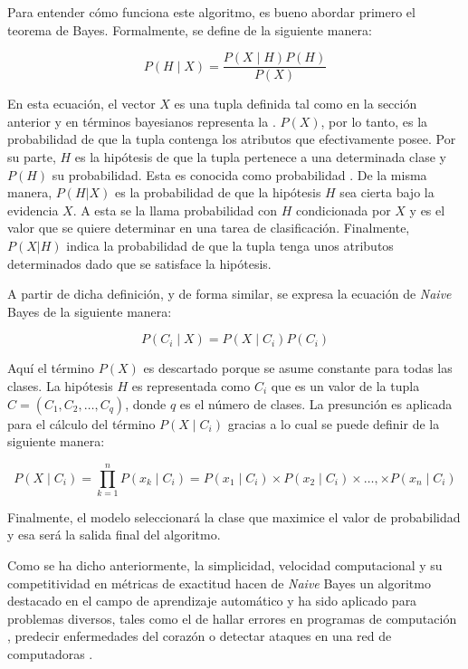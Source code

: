 Para entender cómo funciona este algoritmo, es bueno abordar primero  el teorema
de Bayes. Formalmente, se define de la siguiente manera:

\begin{equation}
	P(H \mid X) = \frac{P(X \mid H) P(H)}{P(X)}
\end{equation}

En esta ecuación, el vector $X$ es una tupla definida tal como en la sección
anterior y en términos bayesianos representa la . $P(X)$,
por lo tanto, es la probabilidad de que la tupla contenga los atributos que
efectivamente posee. Por su parte, $H$ es la hipótesis de que la tupla pertenece
a una determinada clase y $P(H)$ su probabilidad. Esta es conocida como
probabilidad . De la misma manera, $P(H|X)$ es la
probabilidad de que la hipótesis $H$ sea cierta bajo la evidencia $X$. A esta se
la llama probabilidad  con $H$ condicionada por $X$ y es
el valor que se quiere determinar en una tarea de clasificación.  Finalmente,
$P(X|H)$ indica la probabilidad de que la tupla tenga unos atributos
determinados dado que se satisface la hipótesis.

A partir de dicha definición, y de forma similar, se expresa la ecuación de
\textit{Naive} Bayes de la siguiente manera:

\begin{equation}
	P(C_{i} \mid X) = P(X \mid C_{i}) P(C_{i})
\end{equation}

Aquí el término $P(X)$ es descartado porque se asume constante para todas las
clases. La hipótesis $H$ es representada como $C_{i}$ que es un valor de la
tupla $C=(C_{1},C_{2},\dots,C_{q})$, donde $q$ es el número de clases. La
presunción  es aplicada para el cálculo del término $P(X \mid
	C_{i})$ gracias a lo cual se puede definir de la siguiente manera:

\begin{equation}
	P(X \mid C_{i}) = \prod\limits_{k=1}^n{P(x_{k} \mid C_{i})} =
	P(x_{1} \mid C_{i}) \times
	P(x_{2} \mid C_{i}) \times \dots, \times
	P(x_{n} \mid C_{i})
\end{equation}

Finalmente, el modelo seleccionará la clase que maximice el valor de
probabilidad y esa será la salida final del algoritmo.

Como se ha dicho anteriormente, la simplicidad, velocidad computacional y su
competitividad en métricas de exactitud hacen de \textit{Naive} Bayes un
algoritmo destacado en el campo de aprendizaje automático
\cite{wickramasinghe_naive_2020} y ha sido aplicado para problemas diversos,
tales como el de hallar errores en programas de computación
\cite{arar_feature_2017}, predecir enfermedades del corazón
\cite{dulhare_prediction_2018} o detectar ataques en una red de computadoras
\cite{kalutarage_detecting_2015}.


